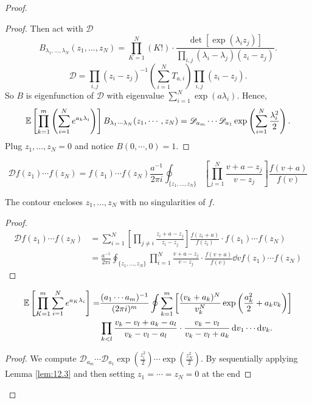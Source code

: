 \begin{proof}
\begin{proof}
Then act with $\mathcal{D}$
\[
B_{\lambda_1,\dots,\lambda_N}(z_1,\dots,z_N)=\prod_{K=1}^N(K!)\cdot\frac{\operatorname{det}[\exp(\lambda_iz_j)]}{\prod_{i,j}(\lambda_i-\lambda_j)(z_i-z_j)}.
\]
\[
\mathcal{D}=\prod_{i,j}(z_i-z_j)^{-1}\left(\sum_{i=1}^NT_{a,i}\right)\prod_{i,j}(z_i-z_j).
\]
So $B$ is eigenfunction of $\mathcal{D}$ with eigenvalue $\sum_{i=1}^N \exp(a\lambda_i)$. Hence,
\[
\mathbb{E}\left[
\prod_{k=1}^m \left(\sum_{i=1}^N e^{a_k\lambda_i}\right)
\right] B_{\lambda_1 \cdots \lambda_N} (z_1,\cdots,z_N) = \mathcal{D}_{a_m} \cdots \mathcal{D}_{a_1} \exp\left(\sum_{i=1}^N\frac{\lambda_i^2}{2}\right).
\]
Plug $z_1,\dots,z_N=0$ and notice $B(0,\cdots,0)=1$.
\end{proof}
\begin{lem}
\label{lem:12.3}
\[
\mathcal{D} f(z_1)\cdots f(z_N)= f(z_1)\cdots f(z_N)\frac{a^{-1}}{2\pi i}\oint_{\{z_1,\dots,z_N\}}\left[\prod_{j=1}^N\frac{v+a-z_j}{v-z_j}\right]\frac{f(v+a)}{f(v)}
\]

The contour encloses $z_1,\dots,z_N$ with no singularities of $f$.
\end{lem}
\begin{proof}
\begin{align*}
    \mathcal{D} f(z_1) \cdots f(z_N) &= \sum_{i=1}^N \left[\prod_{j\neq i} \frac{z_i+a-z_j}{z_i-z_j}\right]\frac{f(z_i+a)}{f(z_i)}\cdot f(z_1)\cdots f(z_N)\\
    &=\frac{a^{-1}}{2\pi i}\oint_{\{z_1,\dots,z_N\}}\prod_{i=1}^N\frac{v+a-z_j}{v-z_j}\cdot\frac{f(v+a)}{f(v)}\dd v f(z_1)\cdots f(z_N)
\end{align*}
\end{proof}

\begin{cor}
\label{RMT_CLT_cor}
    \begin{align*}
    \mathbb{E}\left[\prod_{K=1}^m\sum_{i=1}^N e^{a_K\lambda_i}\right] = &\frac{(a_1\cdots a_m)^{-1}}{(2\pi i)^m} \oint \sum_{k=1}^m \left[ \frac{(v_k+a_k)^N}{v_k^N} \exp\left(\frac{a_k^2}{2} + a_kv_k\right)\right] \\
    &\prod_{k<l} \frac{v_k-v_l+a_k-a_l}{v_k-v_l-a_l} \cdot \frac{v_k-v_l}{v_k-v_l+a_k} \mathop{}\!\mathrm{d} v_1\cdots \mathop{}\!\mathrm{d} v_k.
    \end{align*}
\end{cor}
\begin{proof}
We compute $\mathcal{D}_{a_m} \cdots \mathcal{D}_{a_1} \exp(\frac{z_i^2}{2})\cdots\exp(\frac{z_N^2}{2})$. By sequentially applying Lemma \ref{lem:12.3} and then setting $z_1=\cdots=z_N=0$ at the end
\end{proof}


\end{proof}
